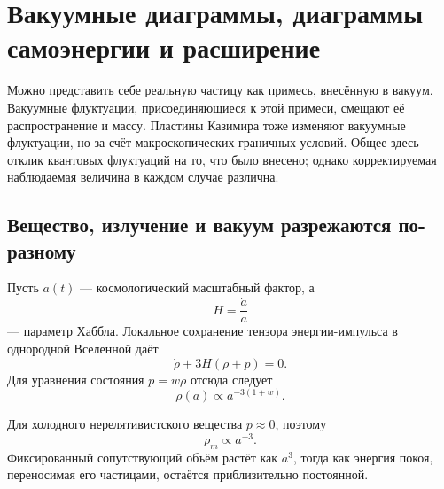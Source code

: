 \section{Вакуумные диаграммы, диаграммы самоэнергии и расширение}

\begin{classroomqa}
\end{classroomqa}

Можно представить себе реальную частицу как примесь, внесённую в вакуум. Вакуумные флуктуации, присоединяющиеся к этой примеси, смещают её распространение и массу. Пластины Казимира тоже изменяют вакуумные флуктуации, но за счёт макроскопических граничных условий. Общее здесь — отклик квантовых флуктуаций на то, что было внесено; однако корректируемая наблюдаемая величина в каждом случае различна.

\vspace{-2pt}
\subsection{Вещество, излучение и вакуум разрежаются по-разному}

Пусть \(a(t)\) — космологический масштабный фактор, а
\begin{equation}
H=\frac{\dot a}{a}
\end{equation}
— параметр Хаббла. Локальное сохранение тензора энергии-импульса в однородной Вселенной даёт
\begin{equation}
\dot\rho+3H(\rho+p)=0.
\end{equation}
Для уравнения состояния \(p=w\rho\) отсюда следует
\begin{equation}
\rho(a)\propto a^{-3(1+w)}.
\end{equation}

Для холодного нерелятивистского вещества \(p\approx0\), поэтому
\begin{equation}
\rho_m\propto a^{-3}.
\end{equation}
Фиксированный сопутствующий объём растёт как \(a^3\), тогда как энергия покоя, переносимая его частицами, остаётся приблизительно постоянной.


